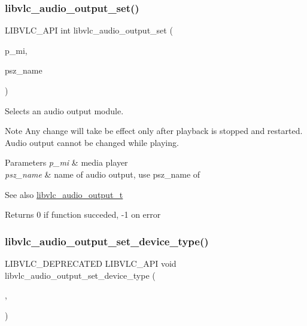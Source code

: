 \subsubsection{\texorpdfstring{libvlc\+\_\+audio\+\_\+output\+\_\+set()}{libvlc\_audio\_output\_set()}}
{\footnotesize\ttfamily L\+I\+B\+V\+L\+C\+\_\+\+A\+PI int libvlc\+\_\+audio\+\_\+output\+\_\+set (\begin{DoxyParamCaption}\item[{libvlc\+\_\+media\+\_\+player\+\_\+t $\ast$}]{p\+\_\+mi,  }\item[{const char $\ast$}]{psz\+\_\+name }\end{DoxyParamCaption})}

Selects an audio output module. \begin{DoxyNote}{Note}
Any change will take be effect only after playback is stopped and restarted. Audio output cannot be changed while playing.
\end{DoxyNote}

\begin{DoxyParams}{Parameters}
{\em p\+\_\+mi} & media player \\
\hline
{\em psz\+\_\+name} & name of audio output, use psz\+\_\+name of \\
\hline
\end{DoxyParams}
\begin{DoxySeeAlso}{See also}
\hyperlink{structlibvlc__audio__output__t}{libvlc\+\_\+audio\+\_\+output\+\_\+t} 
\end{DoxySeeAlso}
\begin{DoxyReturn}{Returns}
0 if function succeded, -\/1 on error 
\end{DoxyReturn}
\mbox{\label{group__libvlc__audio_ga94d41f5e5f0f98a6560c8519f6b9b0d0}} 
\subsubsection{\texorpdfstring{libvlc\+\_\+audio\+\_\+output\+\_\+set\+\_\+device\+\_\+type()}{libvlc\_audio\_output\_set\_device\_type()}}
{\footnotesize\ttfamily L\+I\+B\+V\+L\+C\+\_\+\+D\+E\+P\+R\+E\+C\+A\+T\+ED L\+I\+B\+V\+L\+C\+\_\+\+A\+PI void libvlc\+\_\+audio\+\_\+output\+\_\+set\+\_\+device\+\_\+type (\begin{DoxyParamCaption}\item[{libvlc\+\_\+media\+\_\+player\+\_\+t $\ast$}]{,  }\item[{int}]{ }\end{DoxyParamCaption})}

